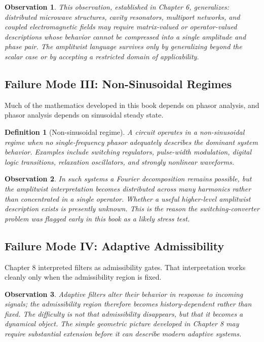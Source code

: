 \documentclass[12pt]{article}
\newtheorem{definition}{Definition}
\newtheorem{observation}{Observation}
\begin{document}
\begin{observation}
This observation, established in Chapter 6, generalizes: distributed microwave structures, cavity resonators, multiport networks, and coupled electromagnetic fields may require matrix-valued or operator-valued descriptions whose behavior cannot be compressed into a single amplitude and phase pair. The amplitwist language survives only by generalizing beyond the scalar case or by accepting a restricted domain of applicability.
\end{observation}

\subsection{Failure Mode III: Non-Sinusoidal Regimes}

Much of the mathematics developed in this book depends on phasor analysis, and phasor analysis depends on sinusoidal steady state.

\begin{definition}[Non-sinusoidal regime]
A circuit operates in a non-sinusoidal regime when no single-frequency phasor adequately describes the dominant system behavior. Examples include switching regulators, pulse-width modulation, digital logic transitions, relaxation oscillators, and strongly nonlinear waveforms.
\end{definition}

\begin{observation}
In such systems a Fourier decomposition remains possible, but the amplitwist interpretation becomes distributed across many harmonics rather than concentrated in a single operator. Whether a useful higher-level amplitwist description exists is presently unknown. This is the reason the switching-converter problem was flagged early in this book as a likely stress test.
\end{observation}

\subsection{Failure Mode IV: Adaptive Admissibility}

Chapter 8 interpreted filters as admissibility gates. That interpretation works cleanly only when the admissibility region is fixed.

\begin{observation}
Adaptive filters alter their behavior in response to incoming signals; the admissibility region therefore becomes history-dependent rather than fixed. The difficulty is not that admissibility disappears, but that it becomes a dynamical object. The simple geometric picture developed in Chapter 8 may require substantial extension before it can describe modern adaptive systems.
\end{observation}
\end{document}
